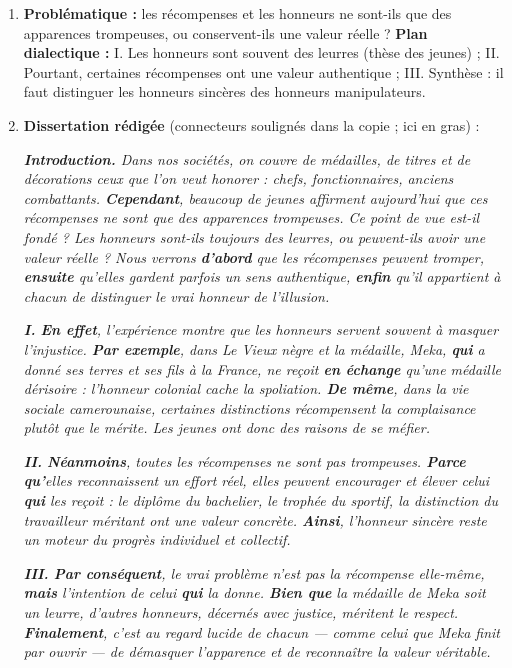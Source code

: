 \documentclass[11pt]{article}
\begin{document}
\begin{corrige}
\begin{enumerate}
\item \textbf{Problématique :} les récompenses et les honneurs ne sont-ils que des apparences trompeuses, ou conservent-ils une valeur réelle ? \textbf{Plan dialectique :} I. Les honneurs sont souvent des leurres (thèse des jeunes) ; II. Pourtant, certaines récompenses ont une valeur authentique ; III. Synthèse : il faut distinguer les honneurs sincères des honneurs manipulateurs.

\item \textbf{Dissertation rédigée} (connecteurs soulignés dans la copie ; ici en gras) :

\emph{\textbf{Introduction.} Dans nos sociétés, on couvre de médailles, de titres et de décorations ceux que l'on veut honorer : chefs, fonctionnaires, anciens combattants. \textbf{Cependant}, beaucoup de jeunes affirment aujourd'hui que ces récompenses ne sont que des apparences trompeuses. Ce point de vue est-il fondé ? Les honneurs sont-ils toujours des leurres, ou peuvent-ils avoir une valeur réelle ? Nous verrons \textbf{d'abord} que les récompenses peuvent tromper, \textbf{ensuite} qu'elles gardent parfois un sens authentique, \textbf{enfin} qu'il appartient à chacun de distinguer le vrai honneur de l'illusion.}

\emph{\textbf{I.} \textbf{En effet}, l'expérience montre que les honneurs servent souvent à masquer l'injustice. \textbf{Par exemple}, dans \emph{Le Vieux nègre et la médaille}, Meka, \textbf{qui} a donné ses terres et ses fils à la France, ne reçoit \textbf{en échange} qu'une médaille dérisoire : l'honneur colonial cache la spoliation. \textbf{De même}, dans la vie sociale camerounaise, certaines distinctions récompensent la complaisance plutôt que le mérite. Les jeunes ont donc des raisons de se méfier.}

\emph{\textbf{II.} \textbf{Néanmoins}, toutes les récompenses ne sont pas trompeuses. \textbf{Parce qu'}elles reconnaissent un effort réel, elles peuvent encourager et élever celui \textbf{qui} les reçoit : le diplôme du bachelier, le trophée du sportif, la distinction du travailleur méritant ont une valeur concrète. \textbf{Ainsi}, l'honneur sincère reste un moteur du progrès individuel et collectif.}

\emph{\textbf{III.} \textbf{Par conséquent}, le vrai problème n'est pas la récompense elle-même, \textbf{mais} l'intention de celui \textbf{qui} la donne. \textbf{Bien que} la médaille de Meka soit un leurre, d'autres honneurs, décernés avec justice, méritent le respect. \textbf{Finalement}, c'est au regard lucide de chacun — comme celui que Meka finit par ouvrir — de démasquer l'apparence et de reconnaître la valeur véritable.}


\end{enumerate}
\end{corrige}
\end{document}
